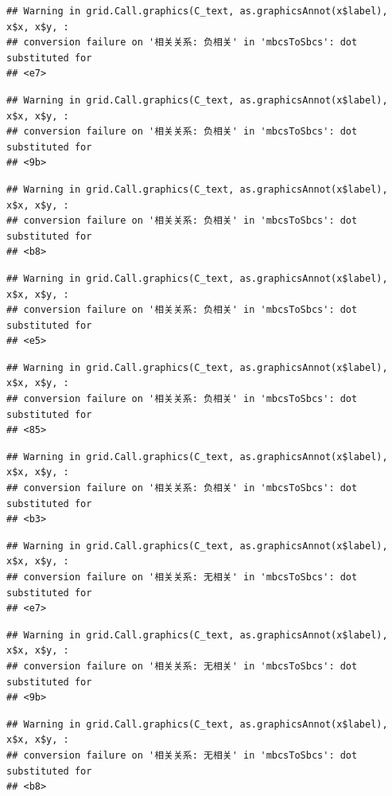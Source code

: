 \documentclass[
]{book}
\begin{document}
\begin{verbatim}
## Warning in grid.Call.graphics(C_text, as.graphicsAnnot(x$label), x$x, x$y, :
## conversion failure on '相关关系: 负相关' in 'mbcsToSbcs': dot substituted for
## <e7>
\end{verbatim}

\begin{verbatim}
## Warning in grid.Call.graphics(C_text, as.graphicsAnnot(x$label), x$x, x$y, :
## conversion failure on '相关关系: 负相关' in 'mbcsToSbcs': dot substituted for
## <9b>
\end{verbatim}

\begin{verbatim}
## Warning in grid.Call.graphics(C_text, as.graphicsAnnot(x$label), x$x, x$y, :
## conversion failure on '相关关系: 负相关' in 'mbcsToSbcs': dot substituted for
## <b8>
\end{verbatim}

\begin{verbatim}
## Warning in grid.Call.graphics(C_text, as.graphicsAnnot(x$label), x$x, x$y, :
## conversion failure on '相关关系: 负相关' in 'mbcsToSbcs': dot substituted for
## <e5>
\end{verbatim}

\begin{verbatim}
## Warning in grid.Call.graphics(C_text, as.graphicsAnnot(x$label), x$x, x$y, :
## conversion failure on '相关关系: 负相关' in 'mbcsToSbcs': dot substituted for
## <85>
\end{verbatim}

\begin{verbatim}
## Warning in grid.Call.graphics(C_text, as.graphicsAnnot(x$label), x$x, x$y, :
## conversion failure on '相关关系: 负相关' in 'mbcsToSbcs': dot substituted for
## <b3>
\end{verbatim}

\begin{verbatim}
## Warning in grid.Call.graphics(C_text, as.graphicsAnnot(x$label), x$x, x$y, :
## conversion failure on '相关关系: 无相关' in 'mbcsToSbcs': dot substituted for
## <e7>
\end{verbatim}

\begin{verbatim}
## Warning in grid.Call.graphics(C_text, as.graphicsAnnot(x$label), x$x, x$y, :
## conversion failure on '相关关系: 无相关' in 'mbcsToSbcs': dot substituted for
## <9b>
\end{verbatim}

\begin{verbatim}
## Warning in grid.Call.graphics(C_text, as.graphicsAnnot(x$label), x$x, x$y, :
## conversion failure on '相关关系: 无相关' in 'mbcsToSbcs': dot substituted for
## <b8>
\end{verbatim}
\end{document}
